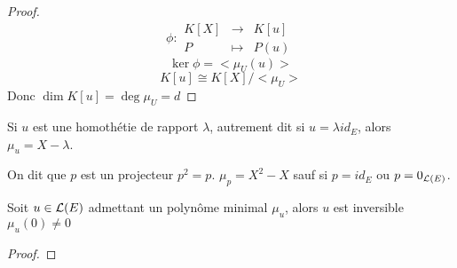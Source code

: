 \begin{proof}
	$$\phi : \begin{array}{rcl}
			K[X] & \to     & K[u] \\
			P    & \mapsto & P(u)
		\end{array}$$
	$$\ker \phi = <\mu_U(u)>$$
	$$ K[u] \cong K[X] / <\mu_U>$$
	Donc $\dim K[u] = \deg \mu_U = d$
\end{proof}

\begin{example}
	Si $u$ est une homothétie de rapport $\lambda$, autrement dit si $u = \lambda id_E$, alors $\mu_u = X - \lambda$.
\end{example}

\begin{remarque}
	On dit que $p$ est un projecteur \ssi ${p}^2 = p$.
	$\mu_p = X^2 - X$ sauf si $p = id_E$ ou $p = 0_{\mathcal{L}(E)}$.
\end{remarque}

\begin{prop}
	Soit $u \in \mathcal{L}(E)$ admettant un polynôme minimal $\mu_u$, alors $u$ est inversible \ssi $\mu_u(0) \neq 0$
\end{prop}

\begin{proof}
\end{proof}
